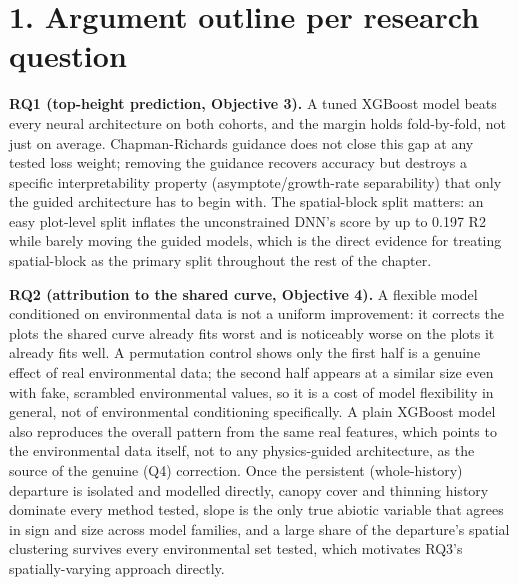 \documentclass[11pt,a4paper]{report}
\begin{document}

\section*{1. Argument outline per research question}

\textbf{RQ1 (top-height prediction, Objective 3).} A tuned XGBoost model beats every
neural architecture on both cohorts, and the margin holds fold-by-fold, not just on
average. Chapman-Richards guidance does not close this gap at any tested loss weight;
removing the guidance recovers accuracy but destroys a specific interpretability
property (asymptote/growth-rate separability) that only the guided architecture has to
begin with. The spatial-block split matters: an easy plot-level split inflates the
unconstrained DNN's score by up to 0.197 R2 while barely moving the guided models,
which is the direct evidence for treating spatial-block as the primary split
throughout the rest of the chapter.

\textbf{RQ2 (attribution to the shared curve, Objective 4).} A flexible model
conditioned on environmental data is not a uniform improvement: it corrects the plots
the shared curve already fits worst and is noticeably worse on the plots it already
fits well. A permutation control shows only the first half is a genuine effect of
real environmental data; the second half appears at a similar size even with fake,
scrambled environmental values, so it is a cost of model flexibility in general, not
of environmental conditioning specifically. A plain XGBoost model also reproduces the
overall pattern from the same real features, which points to the environmental data
itself, not to any physics-guided architecture, as the source of the genuine (Q4)
correction. Once the persistent (whole-history) departure is isolated and modelled
directly, canopy cover and thinning history dominate every method tested, slope is the
only true abiotic variable that agrees in sign and size across model families, and a
large share of the departure's spatial clustering survives every environmental set
tested, which motivates RQ3's spatially-varying approach directly.
\end{document}
